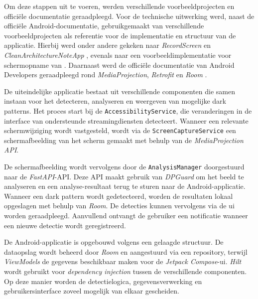 \vspace{1em}

Om deze stappen uit te voeren, werden verschillende voorbeeldprojecten en officiële documentatie geraadpleegd. Voor de technische uitwerking werd, naast de officiële Android-documentatie, gebruikgemaakt van verschillende voorbeeldprojecten als referentie voor de implementatie en structuur van de applicatie. Hierbij werd onder andere gekeken naar \textit{RecordScreen} \autocite{LacknerRecordScreen} en \textit{CleanArchitectureNoteApp} \autocite{LacknerCleanArchitecture}, evenals naar een voorbeeldimplementatie voor schermopname van \textcite{Ch8nScreenCapture}. Daarnaast werd de officiële documentatie van Android Developers geraadpleegd rond \textit{MediaProjection}, \textit{Retrofit} en \textit{Room} \autocite{AndroidMediaProjection,AndroidRetrofit,AndroidRoom}.

\vspace{1em}

De uiteindelijke applicatie bestaat uit verschillende componenten die samen instaan voor het detecteren, analyseren en weergeven van mogelijke dark patterns. Het proces start bij de \texttt{AccessibilityService}, die veranderingen in de interface van ondersteunde streamingdiensten detecteert. Wanneer een relevante schermwijziging wordt vastgesteld, wordt via de \texttt{ScreenCaptureService} een schermafbeelding van het scherm gemaakt met behulp van de \textit{MediaProjection API}.

\vspace{1em}

De schermafbeelding wordt vervolgens door de \texttt{AnalysisManager} doorgestuurd naar de \textit{FastAPI}-API. Deze API maakt gebruik van \textit{DPGuard} om het beeld te analyseren en een analyse-resultaat terug te sturen naar de Android-applicatie. Wanneer een dark pattern wordt gedetecteerd, worden de resultaten lokaal opgeslagen met behulp van \textit{Room}. De detecties kunnen vervolgens via de \acrlong{ui} worden geraadpleegd. Aanvullend ontvangt de gebruiker een notificatie wanneer een nieuwe detectie wordt geregistreerd.

\vspace{1em}

De Android-applicatie is opgebouwd volgens een gelaagde structuur. De dataopslag wordt beheerd door \textit{Room} en aangestuurd via een repository, terwijl \textit{ViewModels} de gegevens beschikbaar maken voor de \textit{Jetpack Compose}-\acrshort{ui}. \textit{Hilt} wordt gebruikt voor \textit{dependency injection} tussen de verschillende componenten. Op deze manier worden de detectielogica, gegevensverwerking en gebruikersinterface zoveel mogelijk van elkaar gescheiden.

